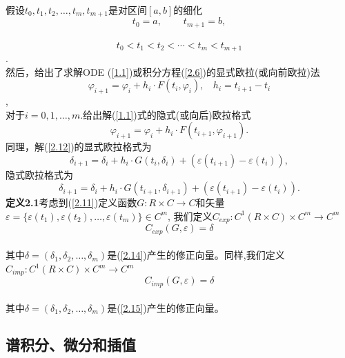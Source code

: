 \documentclass[12pt,a4paper]{article}
\begin{document}
假设$t_0,t_1,t_2,\ldots,t_m,t_{m+1}$是对区间$[a,b]$的细化\\
$$t_0=a,~~~~~~~~~~t_{m+1}=b,$$\\
$$t_0<t_1<t_2<\cdots<t_m<t_{m+1}$$.\\
然后，给出了求解ODE (\ref{1.1})或积分方程(\ref{2.6})的显式欧拉(或向前欧拉)法\\
$$\varphi_{i+1}=\varphi_i+h_i \cdot F(t_i,\varphi_i),~~~~h_i=t_{i+1}-t_i$$,\\
对于$i = 0,1,\ldots,m$.给出解(\ref{1.1})式的隐式(或向后)欧拉格式\\
\begin{equation}
\varphi_{i+1}=\varphi_i+h_i \cdot F(t_{i+1},\varphi_{i+1}).
\end{equation}
同理，解(\ref{2.12})的显式欧拉格式为\\
\begin{equation}
\label{2.14}
\delta_{i+1}=\delta_i+h_i \cdot G(t_{i},\delta_{i})+(\varepsilon(t_{i+1})-\varepsilon(t_i)),
\end{equation}
隐式欧拉格式为\\
\begin{equation}
\label{2.15}
\delta_{i+1}=\delta_i+h_i \cdot G(t_{i+1},\delta_{i+1})+(\varepsilon(t_{i+1})-\varepsilon(t_i)).
\end{equation}
\textbf{定义2.1}考虑到(\ref{2.11})定义函数$G:R \times C \rightarrow C$和矢量$\varepsilon= \{\varepsilon(t_1),\varepsilon(t_2),\ldots,\varepsilon(t_m)\} \in C^m$, 我们定义$C_{exp}:C^1(R \times C) \times C^m \rightarrow C^m$\\
$$C_{exp}(G,\varepsilon)=\delta$$\\
其中$\delta=(\delta_1,\delta_2,\ldots,\delta_m)$是(\ref{2.14})产生的修正向量。同样,我们定义$C_{imp}:C^1(R \times C) \times C^m \rightarrow C^m$\\
$$C_{imp}(G,\varepsilon)=\delta$$\\
其中$\delta=(\delta_1,\delta_2,\ldots,\delta_m)$是(\ref{2.15})产生的修正向量。\\

\subsection{谱积分、微分和插值}
\end{document}
